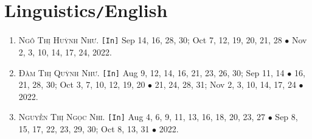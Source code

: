 \documentclass{article}
\numberwithin{equation}{section}
\begin{document}
\section{Linguistics\texttt{/}English}
\begin{enumerate}
	\item \textsc{Ngô Thị Huỳnh Như.} \texttt{[In]} Sep 14, 16, 28, 30; Oct 7, 12, 19, 20, 21, 28 $\bullet$ Nov 2, 3, 10, 14, 17, 24, 2022.
	\item \textsc{Đàm Thị Quỳnh Như.} \texttt{[In]} Aug 9, 12, 14, 16, 21, 23, 26, 30; Sep 11, 14 $\bullet$ 16, 21, 28, 30; Oct 3, 7, 10, 12, 19, 20 $\bullet$ 21, 24, 28, 31; Nov 2, 3, 10, 14, 17, 24 $\bullet$ 2022.
	\item \textsc{Nguyễn Thị Ngọc Nhi.} \texttt{[In]} Aug 4, 6, 9, 11, 13, 16, 18, 20, 23, 27 $\bullet$ Sep 8, 15, 17, 22, 23, 29, 30; Oct 8, 13, 31 $\bullet$ 2022.
\end{enumerate}


\printbibliography[heading=bibintoc]
	
\end{document}
